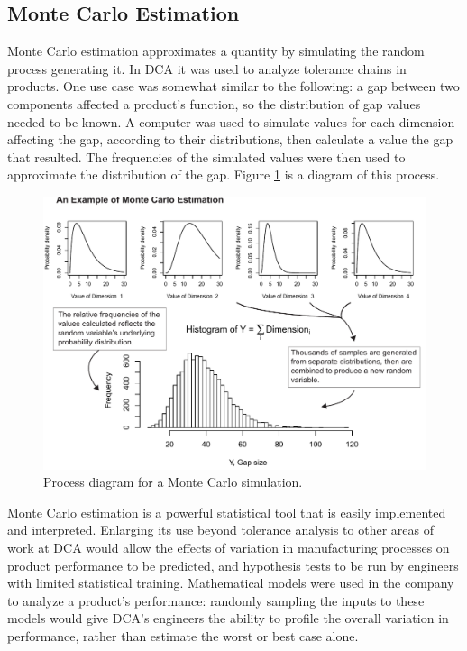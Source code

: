 \documentclass[11pt,a4paper,article]{memoir} %
\begin{document}
\subsection*{Monte Carlo Estimation}
Monte Carlo estimation approximates a quantity by simulating the random process generating it. In DCA it was used to analyze tolerance chains in products. One use case was somewhat similar to the following: a gap between two components affected a product's function, so the distribution of gap values needed to be known. A computer was used to simulate values for each dimension affecting the gap, according to their distributions, then calculate a value the gap that resulted. The frequencies of the simulated values were then used to approximate the distribution of the gap. Figure \ref{fig:monte_carlo} is a diagram of this process.
\begin{figure}[h!]
\includegraphics[width=\textwidth]{MC_estimation.pdf}
\caption{Process diagram for a Monte Carlo simulation.}
\label{fig:monte_carlo}
\end{figure}

Monte Carlo estimation is a powerful statistical tool that is easily implemented and interpreted. Enlarging its use beyond tolerance analysis to other areas of work at DCA would allow the effects of variation in manufacturing processes on product performance to be predicted, and hypothesis tests to be run by engineers with limited statistical training. Mathematical models were used in the company to analyze a product's performance: randomly sampling the inputs to these models would give DCA's engineers the ability to profile the overall variation in performance, rather than estimate the worst or best case alone.
\end{document}
